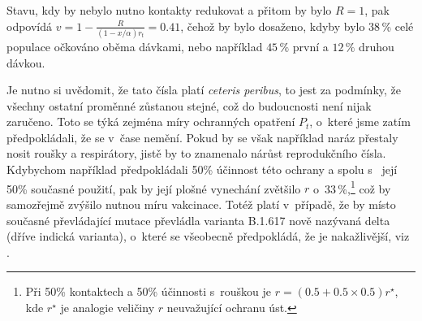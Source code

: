 Stavu, kdy by nebylo nutno kontakty redukovat a přitom by bylo $R=1$,
pak odpovídá $v=1-\frac{R}{(1-x/\alpha)r_{t}}=0.41$, čehož by bylo dosaženo, kdyby bylo 38\,\% celé populace očkováno oběma dávkami, nebo
například $45\,\%$ první a $12\,\%$ druhou dávkou.

Je nutno si uvědomit, že tato čísla platí \emph{ceteris peribus},
to jest za podmínky, že všechny ostatní proměnné zůstanou stejné, což do budoucnosti není nijak zaručeno.
Toto se týká zejména míry ochranných opatření $P_{t}$, o~které jsme zatím
předpokládali, že se v~čase nemění. Pokud by se však například
naráz přestaly nosit roušky a respirátory, jistě by to znamenalo nárůst
reprodukčního čísla. Kdybychom například předpokládali 50\%
účinnost této ochrany a spolu s~\cite{paqcovid} její 50\% současné
použití, pak by její plošné vynechání zvětšilo $r$ o~33\,\%,\footnote{Při 50\% kontaktech a 50\% účinnosti s~rouškou je $r=(0.5+0.5\times0.5)r^{\star}$,
kde $r^{\star}$ je analogie veličiny $r$ neuvažující ochranu úst.} což by samozřejmě zvýšilo nutnou míru vakcinace. Totéž platí v~případě,
že by místo současné převládající mutace převládla 
varianta B.1.617 nově nazývaná delta (dříve indická varianta), o~které se všeobecně předpokládá, že je nakažlivější,
viz \cite{ecdc2021india}. 

